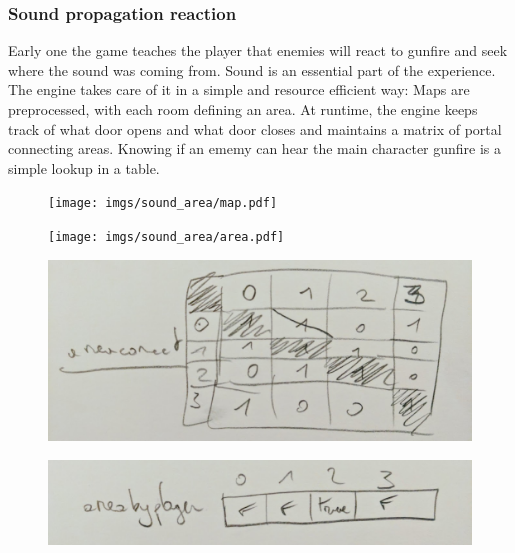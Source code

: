 \subsubsection{Sound propagation reaction}
Early one the game teaches the player that enemies will react to gunfire and seek where the sound was coming from. Sound is an essential part of the experience. The engine takes care of it in a simple and resource efficient way: Maps are preprocessed, with each room defining an area. At runtime, the engine keeps track of what door opens and what door closes and maintains a matrix of portal connecting areas.
Knowing if an ememy can hear the main character gunfire is a simple lookup in a table.

\par
\begin{figure}[H]
 \centering
 \texttt{[image: imgs/sound\_area/map.pdf]}
\end{figure}
\par

\par
\begin{figure}[H]
 \centering
 \texttt{[image: imgs/sound\_area/area.pdf]}
\end{figure}
\par

\par
\begin{figure}[H]
 \centering
 \includegraphics[width=\textwidth]{imgs/soud_propagation/areaconnect.png}
\end{figure}
\par

\par
\begin{figure}[H]
 \centering
 \includegraphics[width=\textwidth]{imgs/soud_propagation/areabyplayer.png}
\end{figure}
\par









